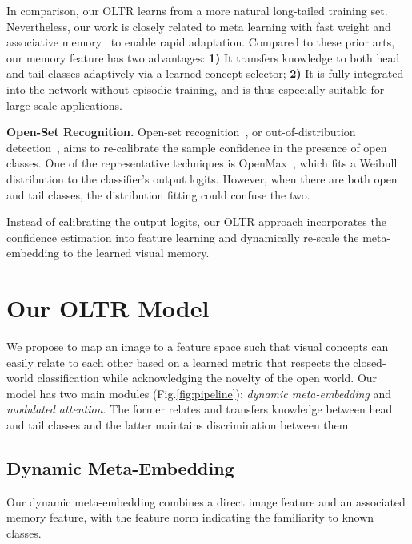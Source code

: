 \documentclass[10pt,twocolumn,letterpaper]{article}
\begin{document}
In comparison, our OLTR learns from a more natural long-tailed training set.
Nevertheless, our work is closely related to meta learning with fast weight and associative memory~\cite{hinton1987using, schmidhuber1992learning, vinyals2016matching, duan2016rl, ba2016using, munkhdalai2017meta} to enable rapid adaptation. 
Compared to these prior arts, our memory feature has two advantages: {\bf 1)} It transfers knowledge to both head and tail classes adaptively via a learned concept selector; {\bf 2)} It is fully integrated into the network without episodic training, and is thus especially suitable for large-scale applications.  

\vspace{2pt}
\noindent
\textbf{Open-Set Recognition.}
Open-set recognition~\cite{scheirer2013toward, bendale2016towards}, or out-of-distribution detection~\cite{devries2018learning, liang2017enhancing}, aims to re-calibrate the sample confidence in the presence of open classes. 
One of the representative techniques is OpenMax~\cite{bendale2016towards}, which fits a Weibull distribution to the classifier's output logits.
However, when there are both open and tail classes, the distribution fitting could confuse the two.


Instead of calibrating the output logits, our OLTR approach incorporates the confidence estimation into feature learning and dynamically re-scale the meta-embedding \wrt to the learned visual memory.

 
\section{Our OLTR Model}

We propose to map an image to a feature space such that visual concepts can easily relate to each other based on a learned metric that respects the closed-world classification while acknowledging the novelty of the open world. Our model has two main modules (Fig.\ref{fig:pipeline}): \emph{dynamic meta-embedding} and \emph{modulated attention}.  The former relates and transfers knowledge between head and tail classes and the latter maintains discrimination between them.










\subsection{Dynamic Meta-Embedding}
Our dynamic meta-embedding combines a direct image feature and an associated memory feature, with the feature norm indicating the familiarity to known classes.
\end{document}
